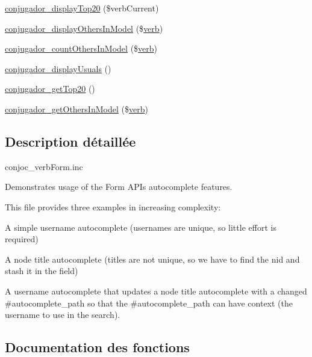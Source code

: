 \begin{DoxyCompactItemize}
\item 
\hyperlink{conjoc__web_form_8inc_adfb69460570fdffecec436447f5ed729}{conjugador\+\_\+display\+Top20} (\$verb\+Current)
\item 
\hyperlink{conjoc__web_form_8inc_a64885b968e081840d6a10adc2a38db9e}{conjugador\+\_\+display\+Others\+In\+Model} (\$\hyperlink{teibase_8php_aa8d8fadfcf4239c7aa288414da9d0ace}{verb})
\item 
\hyperlink{conjoc__web_form_8inc_ac96a30f96cb3957ed4ac47c4eb40df10}{conjugador\+\_\+count\+Others\+In\+Model} (\$\hyperlink{teibase_8php_aa8d8fadfcf4239c7aa288414da9d0ace}{verb})
\item 
\hyperlink{conjoc__web_form_8inc_a1bfbce593ac5c763b1542fa713249aa3}{conjugador\+\_\+display\+Usuals} ()
\item 
\hyperlink{conjoc__web_form_8inc_a9ab9dfc2c3015a0855c27f37812bb897}{conjugador\+\_\+get\+Top20} ()
\item 
\hyperlink{conjoc__web_form_8inc_a90ac7751a59eefed3b3576f1cedb016f}{conjugador\+\_\+get\+Others\+In\+Model} (\$\hyperlink{teibase_8php_aa8d8fadfcf4239c7aa288414da9d0ace}{verb})
\end{DoxyCompactItemize}


\subsection{Description détaillée}
conjoc\+\_\+verb\+Form.\+inc

Demonstrates usage of the Form A\+PI\textquotesingle{}s autocomplete features.

This file provides three examples in increasing complexity\+:
\begin{DoxyItemize}
\item A simple username autocomplete (usernames are unique, so little effort is required)
\item A node title autocomplete (titles are not unique, so we have to find the nid and stash it in the field)
\item A username autocomplete that updates a node title autocomplete with a changed \#autocomplete\+\_\+path so that the \#autocomplete\+\_\+path can have context (the username to use in the search). 
\end{DoxyItemize}

\subsection{Documentation des fonctions}
\hypertarget{conjoc__web_form_8inc_a3698c970fd73cda200a3a459dc50beec}{}\label{conjoc__web_form_8inc_a3698c970fd73cda200a3a459dc50beec} 
